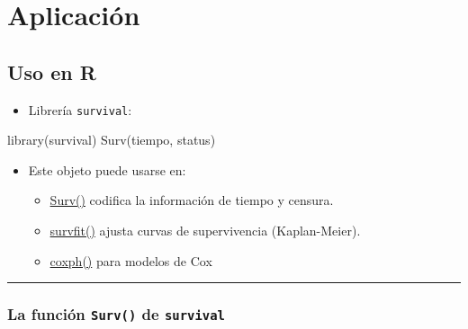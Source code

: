 \documentclass[
]{article}
\newenvironment{Shaded}{\begin{snugshade}}{\end{snugshade}}
\newcommand{\FunctionTok}[1]{\textcolor[rgb]{0.28,0.35,0.67}{#1}}
\newcommand{\NormalTok}[1]{\textcolor[rgb]{0.00,0.23,0.31}{#1}}
\providecommand{\tightlist}{%
  \setlength{\itemsep}{0pt}\setlength{\parskip}{0pt}}
\begin{document}
\section{Aplicación}\label{aplicaciuxf3n}

\subsection{Uso en R}\label{uso-en-r}

\begin{itemize}
\tightlist
\item
  Librería \texttt{survival}:
\end{itemize}

\begin{Shaded}
\begin{Highlighting}[]
\FunctionTok{library}\NormalTok{(survival)}
\FunctionTok{Surv}\NormalTok{(tiempo, status)}
\end{Highlighting}
\end{Shaded}

\begin{itemize}
\tightlist
\item
  Este objeto puede usarse en:

  \begin{itemize}
  \tightlist
  \item
    \href{https://www.rdocumentation.org/packages/survival/versions/3.5-7/topics/Surv}{Surv()}
    codifica la información de tiempo y censura.
  \item
    \href{https://www.rdocumentation.org/packages/survival/versions/3.8-3/topics/survfit.formula}{survfit()}
    ajusta curvas de supervivencia (Kaplan-Meier).
  \item
    \href{https://www.rdocumentation.org/packages/survival/versions/3.5-7/topics/coxph}{coxph()}
    para modelos de Cox
  \end{itemize}
\end{itemize}

\begin{center}\rule{0.5\linewidth}{0.5pt}\end{center}

\subsubsection{\texorpdfstring{La función \texttt{Surv()} de
\texttt{survival}}{La función Surv() de survival}}\label{la-funciuxf3n-surv-de-survival}
\end{document}
